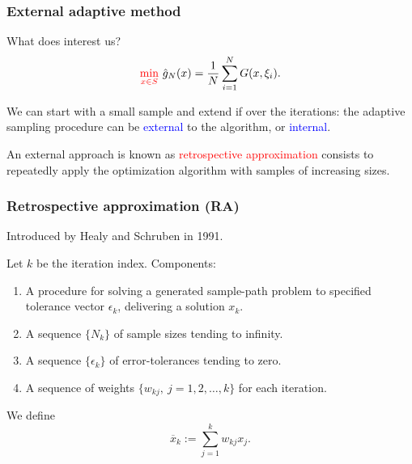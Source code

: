 \documentclass{beamer}
\begin{document}
\begin{frame}
\frametitle{External adaptive method}

What does interest us?
\[
\textcolor{red}{\min_{x \in S}}\ \hat{g}_N(x) = \frac{1}{N} \sum_{i = 1}^N G (x, \xi_i).
\]

\mbox{}

We can start with a small sample and extend if over the iterations:
the adaptive sampling procedure can be \textcolor{blue}{external} to the algorithm, or \textcolor{blue}{internal}.

\mbox{}

An external approach is known as \textcolor{red}{retrospective approximation} consists to repeatedly apply the optimization algorithm with samples of increasing sizes.

\end{frame}

\begin{frame}
\frametitle{Retrospective approximation (RA)}

Introduced by Healy and Schruben in 1991.

\mbox{}

Let $k$ be the iteration index. Components:
\begin{enumerate}
	\item 
	A procedure for solving a generated sample-path problem to specified tolerance vector $\epsilon_k$, delivering a solution $x_k$.
	\item
	A sequence $\{ N_k \}$ of sample sizes tending to infinity.
	\item
	A sequence $\{ \epsilon_k \}$ of error-tolerances tending to zero.
	\item
	A sequence of weights $\{ w_{kj},\ j = 1, 2,\ldots, k \}$ for each iteration.
\end{enumerate}

\mbox{}

We define
$$
\overline{x}_k := \sum_{j = 1}^k w_{kj} x_j.
$$
\end{frame}
\end{document}

